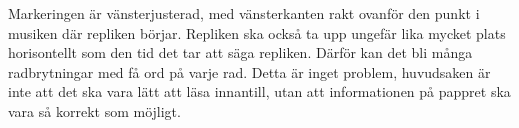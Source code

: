 Markeringen är vänsterjusterad, med vänsterkanten rakt ovanför den punkt i musiken där repliken börjar. Repliken ska också ta upp ungefär lika mycket plats horisontellt som den tid det tar att säga repliken. Därför kan det bli många radbrytningar med få ord på varje rad. Detta är inget problem, huvudsaken är inte att det ska vara lätt att läsa innantill, utan att informationen på pappret ska vara så korrekt som möjligt.
